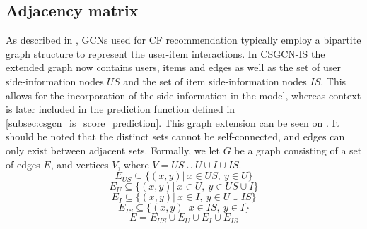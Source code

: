 
\subsection{Adjacency matrix}\label{subsec:csgcn_is_adj_mat}
As described in , GCNs used for CF recommendation typically employ a bipartite graph structure to represent the user-item interactions.
In CSGCN-IS the extended graph now contains users, items and edges as well as the set of user side-information nodes $US$ and the set of item side-information nodes $IS$.
This allows for the incorporation of the side-information in the model, whereas context is later included in the prediction function defined in \autoref{subsec:csgcn_is_score_prediction}.
This graph extension can be seen on .
It should be noted that the distinct sets cannot be self-connected, and edges can only exist between adjacent sets.
Formally, we let $G$ be a graph consisting of a set of edges $E$, and vertices $V$, where $V = US \cup U \cup I \cup IS$.
$$E_{US} \subseteq \{ (x,y) | \: x \in US, \: y \in U  \}$$
$$E_U \subseteq \{ (x,y) | \: x \in U, \: y \in US \cup I \}$$
$$E_I \subseteq \{ (x,y) | \: x \in I, \: y \in U \cup IS \}$$
$$E_{IS} \subseteq \{ (x,y) | \: x \in IS, \: y \in I  \}$$
$$E = E_{US} \cup E_{U} \cup E_{I} \cup E_{IS} $$

